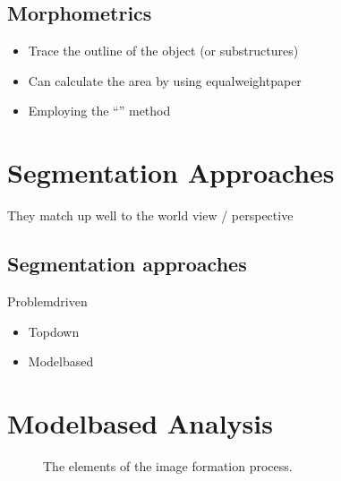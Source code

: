 \documentclass[letterpaper,10pt,english]{sphinxmanual}
\begin{document}
\section{Morphometrics}
\label{\detokenize{04-BasicSegmentation:morphometrics}}\begin{itemize}
\item {} 
\sphinxAtStartPar
Trace the outline of the object (or sub\sphinxhyphen{}structures)

\item {} 
\sphinxAtStartPar
Can calculate the area by using equal\sphinxhyphen{}weight\sphinxhyphen{}paper

\item {} 
\sphinxAtStartPar
Employing the “” method

\end{itemize}


\chapter{Segmentation Approaches}
\label{\detokenize{04-BasicSegmentation:segmentation-approaches}}
\sphinxAtStartPar
They match up well to the world view / perspective

\sphinxAtStartPar
{}


\section{Segmentation approaches}
\label{\detokenize{04-BasicSegmentation:id2}}


\sphinxAtStartPar
Problem\sphinxhyphen{}driven
\begin{itemize}
\item {} 
\sphinxAtStartPar
Top\sphinxhyphen{}down

\item {} 
\sphinxAtStartPar
{} Model\sphinxhyphen{}based

\end{itemize}




\chapter{Model\sphinxhyphen{}based Analysis}
\label{\detokenize{04-BasicSegmentation:model-based-analysis}}
\begin{figure}[htbp]
\centering
\capstart

\noindent{}
\caption{The elements of the image formation process.}\label{\detokenize{04-BasicSegmentation:id3}}\end{figure}
\end{document}
